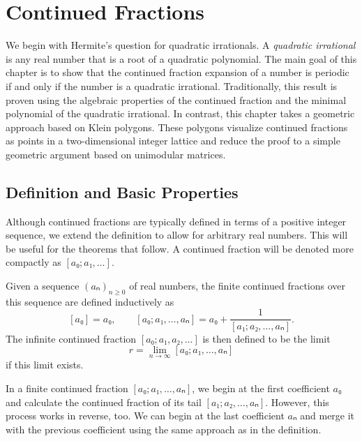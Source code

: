 \chapter{Continued Fractions}
\label{ch:quadratic}

We begin with Hermite's question for quadratic irrationals.
A \emph{quadratic irrational} is any real number
that is a root of a quadratic polynomial.
The main goal of this chapter is to show that the continued fraction expansion
of a number is periodic if and only if the number is a quadratic irrational.
Traditionally, this result is proven using the algebraic properties of the
continued fraction and the minimal polynomial of the quadratic irrational.
In contrast, this chapter takes a geometric approach based on Klein polygons.
These polygons visualize continued fractions as points in a two-dimensional
integer lattice and reduce the proof to a simple geometric argument based on unimodular matrices.

\section{Definition and Basic Properties}
\label{sec:cf-def}

Although continued fractions are typically defined in terms of a positive integer sequence,
we extend the definition to allow for arbitrary real numbers.
This will be useful for the theorems that follow.
A continued fraction will be denoted more compactly as $[a₀; a₁, …]$.

\begin{definition}
  \label{def:cont-frac}
  Given a sequence $(aₙ)_{n≥0}$ of real numbers, the finite continued
  fractions over this sequence are defined inductively as
  \[
    [a₀] = a₀, \qquad
    [a₀; a₁, …, aₙ] = a₀ + \frac{1}{[a₁; a₂, …, aₙ]}.
  \]
  The infinite continued fraction $[a₀; a₁, a₂, …]$ is then defined to be the limit
  \[
    r = \lim_{n → ∞} [a₀; a₁, …, aₙ]
  \]
  if this limit exists.
\end{definition}

In a finite continued fraction $[a₀; a₁, …, aₙ]$,
we begin at the first coefficient $a₀$ and
calculate the continued fraction of its tail $[a₁; a₂, …, aₙ]$.
However, this process works in reverse, too.
We can begin at the last coefficient $aₙ$
and merge it with the previous coefficient
using the same approach as in the definition.


